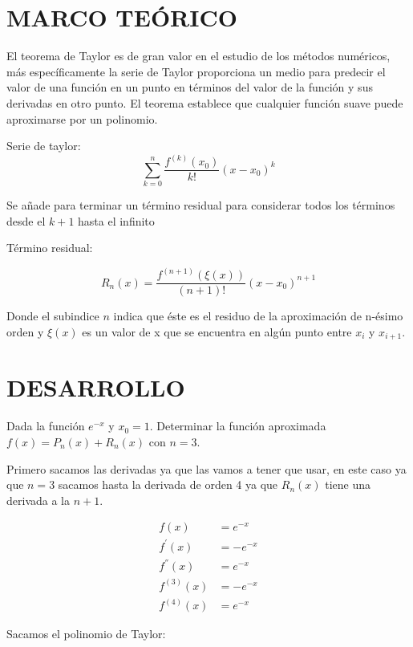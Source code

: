 \documentclass[12pt]{article}
\begin{document}
\section*{MARCO TEÓRICO}
El teorema de Taylor es de gran valor en el estudio de los métodos numéricos, más específicamente
la serie de Taylor proporciona un medio para predecir el valor de una función
en un punto en términos del valor de la función y sus derivadas en otro punto.
El teorema establece que cualquier función suave puede aproximarse por un polinomio.

Serie de taylor:
\[\sum_{k = 0}^{n} \frac{f^{(k)}(x_0)}{k!} (x - x_0)^{k}\]

Se añade para terminar un término residual para considerar todos los términos desde el \(k + 1\) hasta el infinito

Término residual:

\[R_n(x) = \frac{f^{(n+1)}(\xi(x))}{(n+1)!} (x - x_0)^{n+1}\]

Donde el subindice \(n\) indica que éste es el residuo de la aproximación de n-ésimo orden
y \(\xi(x)\) es un valor de x que se encuentra en algún punto entre \(x_i\) y \(x_{i+1}\). \cite{chapra2011metodos}   

\section*{DESARROLLO}
Dada la función \(e^{-x}\) y \(x_0 = 1\). Determinar la función aproximada \( f(x) = P_n(x) + R_n(x)\) con \(n = 3\).

Primero sacamos las derivadas ya que las vamos a tener que usar, en este caso ya que \(n = 3\) sacamos hasta la derivada de orden 4 ya que \(R_n(x)\) tiene una derivada a la \(n+1\).

\[
    \begin{aligned}
         f(x) &= e^{-x} \\
         f^{'}(x) &= -e^{-x} \\
         f^{''}(x) &= e^{-x} \\
         f^{(3)}(x) &= -e^{-x} \\
         f^{(4)}(x) &= e^{-x} 
    \end{aligned}
\]

Sacamos el polinomio de Taylor:
\end{document}
